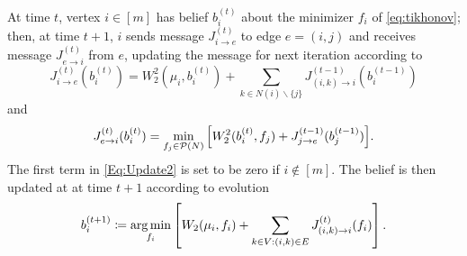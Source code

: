 \documentclass[letterpaper]{article} %
\begin{document}
At time $t$, vertex $i\in [m]$ has belief $b^{(t)}_i$ about the minimizer $f_i$ of \eqref{eq:tikhonov}; then, at time $t+1$, $i$ sends message $J^{(t)}_{i\to e}$ to edge $e=(i, j)$ and receives message $J^{(t)}_{e\to i}$ from $e$, updating the message for next iteration according to
\begin{equation}\label{Eq:Update2}
J^{(t)}_{i\to e} (b^{(t)}_i) = W_2^2(\mu_i, b^{(t)}_i) + \sum_{k\in N(i)\backslash \{j\}}J^{(t-1)}_{(i,k)\to i}(b^{(t-1)}_i)
\end{equation}
and 
\begin{equation}\label{Eq:Update}
    J^{(t)}_{e\to i}(b^{(t)}_i) =  \min_{f_j\in \P(N)}\Big[W_2^2(b^{(t)}_i, f_j) + J^{(t-1)}_{j\to e}(b^{(t-1)}_j)\Big].
\end{equation}
The first term in \eqref{Eq:Update2} is set to be zero if $i\notin [m]$. The belief is then updated at at time $t+1$ according to evolution
$$b^{(t+1)}_i \coloneqq \argmin_{f_i} \left[W_2(\mu_i, f_i) + \sum_{k\in V: (i, k)\in E } J^{(t)}_{(i, k)\to i}(f_i)\right].$$
\end{document}
